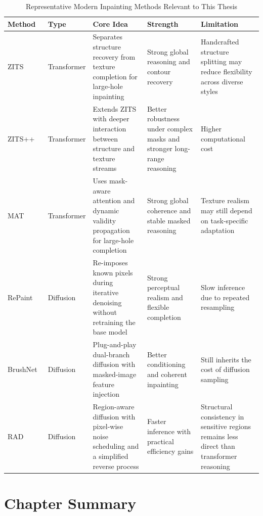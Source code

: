\documentclass[12pt, twoside]{report}
\begin{document}
\begin{table}[H]
\centering
\caption{Representative Modern Inpainting Methods Relevant to This Thesis}
\small
\begin{tabular}{|p{2.0cm}|p{1.6cm}|p{3.2cm}|p{3.0cm}|p{3.0cm}|}
\hline
\textbf{Method} & \textbf{Type} & \textbf{Core Idea} & \textbf{Strength} & \textbf{Limitation} \\
\hline
ZITS~\cite{zeng2022zits} & Transformer & Separates structure recovery from texture completion for large-hole inpainting & Strong global reasoning and contour recovery & Handcrafted structure splitting may reduce flexibility across diverse styles \\
\hline
ZITS++~\cite{zeng2023zitspp} & Transformer & Extends ZITS with deeper interaction between structure and texture streams & Better robustness under complex masks and stronger long-range reasoning & Higher computational cost \\
\hline
MAT~\cite{li2022mat} & Transformer & Uses mask-aware attention and dynamic validity propagation for large-hole completion & Strong global coherence and stable masked reasoning & Texture realism may still depend on task-specific adaptation \\
\hline
RePaint~\cite{lugmayr2022repaint} & Diffusion & Re-imposes known pixels during iterative denoising without retraining the base model & Strong perceptual realism and flexible completion & Slow inference due to repeated resampling \\
\hline
BrushNet~\cite{ju2024brushnet} & Diffusion & Plug-and-play dual-branch diffusion with masked-image feature injection & Better conditioning and coherent inpainting & Still inherits the cost of diffusion sampling \\
\hline
RAD~\cite{kim2025rad} & Diffusion & Region-aware diffusion with pixel-wise noise scheduling and a simplified reverse process & Faster inference with practical efficiency gains & Structural consistency in sensitive regions remains less direct than transformer reasoning \\
\hline
\end{tabular}
\normalsize
\label{tab:trans_vs_diff}
\end{table}

\section{Chapter Summary}
\end{document}
